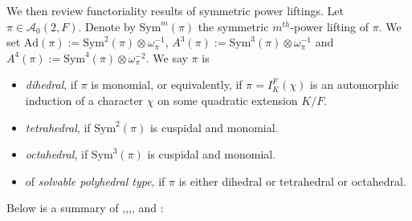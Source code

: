\documentclass[12pt]{amsart}
\newcommand{\Ad}{\text{Ad}}
\newcommand{\Sym}{\text{Sym}}
\newcommand{\cA}{\mathcal{A}}
\begin{document}
We then review functoriality results of symmetric power liftings. Let $\pi \in \cA_0(2,F)$. Denote by $\Sym^m(\pi)$ the symmetric $m^{th}$-power lifting of $\pi$. We set $\Ad(\pi) := \Sym^2(\pi) \otimes \omega_\pi^{-1}$, $A^3(\pi) := \Sym^3(\pi) \otimes \omega_\pi^{-1}$ and $A^4(\pi) := \Sym^4(\pi) \otimes \omega_\pi^{-2}$. We say $\pi$ is 
\begin{itemize}
    \item \textit{dihedral}, if $\pi$ is monomial, or equivalently, if $\pi = I_K^F(\chi)$ is an automorphic induction of a character $\chi$ on some quadratic extension $K/F$.
    \item \textit{tetrahedral}, if $\Sym^2(\pi)$ is cuspidal and monomial.
    \item \textit{octahedral}, if $\Sym^3(\pi)$ is cuspidal and monomial. 
    \item of \textit{solvable polyhedral type}, if $\pi$ is either dihedral or tetrahedral or octahedral.
\end{itemize}
Below is a summary of \cite[Theorem 9.3]{GelbartJacquet1978},\cite[Theorem B]{KimShahidi2002Cube},\cite[Theorem 2.2.2]{KimShahidi2002FourthPowerCuspidality},\cite[Theorem B]{Kim2003fourth},\cite[Theorem 3.3.7]{KimShahidi2002FourthPowerCuspidality} and \cite[Theorem A]{NewtonThorne2025}:
\end{document}
